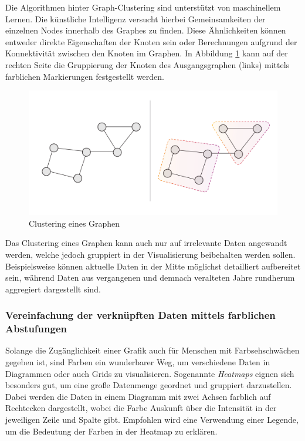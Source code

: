 Die Algorithmen hinter Graph-Clustering sind unterstützt von maschinellem Lernen. Die künstliche Intelligenz versucht hierbei Gemeinsamkeiten der einzelnen Nodes innerhalb des Graphes zu finden. Diese Ähnlichkeiten können entweder direkte Eigenschaften der Knoten sein oder Berechnungen aufgrund der Konnektivität zwischen den Knoten im Graphen. In Abbildung \ref{fig:GraphClusteringAlgorithm} kann auf der rechten Seite die Gruppierung der Knoten des Ausgangsgraphen (links) mittels farblichen Markierungen festgestellt werden. \cite{pusic2023clustering}

\begin{figure}
    \centering
    \includegraphics[width=1\textwidth]{content/img/Research/Visualisation/graph_clustering_algorithm.png}
    \caption{Clustering eines Graphen \cite{pusic2023clustering}}
    \label{fig:GraphClusteringAlgorithm}
\end{figure}
\FloatBarrier

Das Clustering eines Graphen kann auch nur auf irrelevante Daten angewandt werden, welche jedoch gruppiert in der Visualisierung beibehalten werden sollen. Beispielsweise können aktuelle Daten in der Mitte möglichst detailliert aufbereitet sein, während Daten aus vergangenen und demnach veralteten Jahre rundherum aggregiert dargestellt sind. \cite{heins2017herausforderungen}

\subsubsection{Vereinfachung der verknüpften Daten mittels farblichen Abstufungen}

Solange die Zugänglichkeit einer Grafik auch für Menschen mit Farbsehschwächen gegeben ist, sind Farben ein wunderbarer Weg, um verschiedene Daten in Diagrammen oder auch Grids zu visualisieren. Sogenannte \emph{Heatmaps} eignen sich besonders gut, um eine große Datenmenge geordnet und gruppiert darzustellen. Dabei werden die Daten in einem Diagramm mit zwei Achsen farblich auf Rechtecken dargestellt, wobei die Farbe Auskunft über die Intensität in der jeweiligen Zeile und Spalte gibt. Empfohlen wird eine Verwendung einer Legende, um die Bedeutung der Farben in der Heatmap zu erklären. \cite{yiheatmap,cinar2023heatmap,kassamara2020heatmap}

